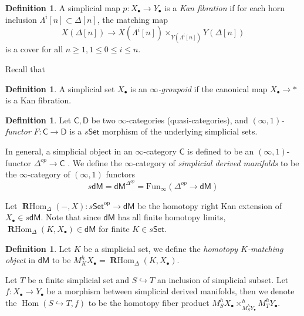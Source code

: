 \documentclass[12pt]{amsart}
\theoremstyle{definition}
\newtheorem{defn}[thm]{Definition}
\theoremstyle{remark}
\numberwithin{equation}{section}
\newcommand{\1}{{\mathbb{1}}}
\newcommand{\op}{\operatorname{op}}
\newcommand{\set}{\mathsf{Set}}
\newcommand{\dm}{\mathsf{dM}}
\newcommand{\Hom}{\operatorname{Hom}}
\newcommand{\rhom}{\operatorname{\mathbf{R}Hom}}
\newcommand{\funi}{\operatorname{Fun_{\infty}}}
\begin{document}
\begin{defn}
	A simplicial map $p:X_{\bullet}\to Y_{\bullet}$ is a {\it Kan fibration} if for each horn inclusion $\Lambda^i[n] \subset \Delta[n]$, the matching map
	\begin{equation*}
	X(\Delta[n])\longrightarrow X(\Lambda^i[n])\times_{Y(\Lambda^i[n])} Y(\Delta[n])
	\end{equation*}
	is a cover for all $n\ge 1, 1\le 0\le i\le n$.
\end{defn}
Recall that
\begin{defn}
	A simplicial set $X_{\bullet}$ is an {\it $\infty$-groupoid} if the canonical map $X_{\bullet}\to *$ is a Kan fibration.
\end{defn}
\begin{defn}%
	Let $\mathsf{C}, \mathsf{D}$ be two $\infty$-categories (quasi-categories), and {\it $(\infty,1)$-functor} $F:\mathsf{C}\to \mathsf{D}$ is a $s\set$ morphism of the underlying simplicial sets.
\end{defn}
In general, a simplicial object in an $\infty$-category $\mathsf{C}$ is defined to be an $(\infty,1)$-functor $\Delta^{op}\to \mathsf{C}$ . We define the $\infty$-category of {\it simplicial derived manifolds} to be the $\infty$-category of $(\infty,1)$ functors
\begin{equation*}
s\dm=\dm^{\Delta^{op}}=\funi(\Delta^{op}\to \dm)
\end{equation*}

Let $\rhom_{\Delta}(-,X): s\set^{\op} \to \dm$ be the homotopy right Kan extension of $X_{\bullet}\in s\dm$. Note that since $\dm$ has all finite homotopy limits, $\rhom_{\Delta}(K, X_{\bullet}) \in \dm$ for finite $K\in s\set$. 

\begin{defn}
    Let $K$ be a simplicial set, we define the {\it homotopy $K$-matching object} in $\dm$  to be $M^h_K X_{\bullet} = \rhom_{\Delta}(K,X_{\bullet}).$
\end{defn}

Let $T$ be a finite simplicial set and $S \hookrightarrow T$ an inclusion of simplicial subset. Let $f: X_{\bullet} \to Y_{\bullet}$ be a morphism between simplicial derived manifolds, then we denote the $\Hom(S \hookrightarrow T, f)$ to be the homotopy fiber product
$M^h_S X_{\bullet} \times^h_{M^h_S Y_{\bullet}} M^h_T Y_{\bullet} $.
\end{document}
